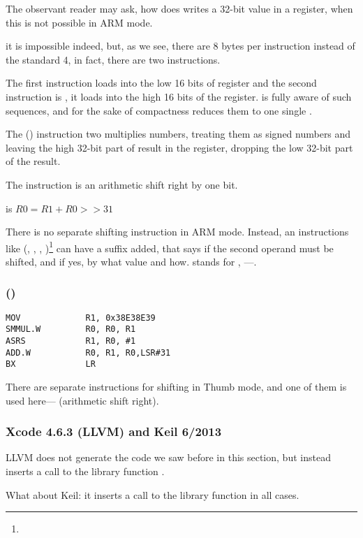 The observant reader may ask, how does \MOV writes a 32-bit value in a register, when this is not possible in ARM mode.

it is impossible indeed, but, as we see,
there are 8 bytes per instruction instead of the standard 4,
in fact, there are two instructions.

The first instruction loads  into the low 16 bits of register and the second instruction is
, it loads  into the high 16 bits of the register.
\IDA is fully aware of such sequences, and for the sake of compactness reduces them to one single .

The  () 
instruction two multiplies numbers, treating them as signed numbers
and leaving the high 32-bit part of result in the  register,
dropping the low 32-bit part of the result.

The instruction is an arithmetic shift right by one bit.

 is $R0=R1 + R0>>31$

\label{shifts_in_ARM_mode}

There is no separate shifting instruction in ARM mode.
Instead, an instructions like 
(\MOV, \ADD, \SUB, )\footnote{\DataProcessingInstructionsFootNote}
can have a suffix added, that says if the second operand must be shifted, and if yes, by what value and how.
 stands for , ---.

\subsubsection{\OptimizingXcodeIV (\ThumbTwoMode)}

\begin{lstlisting}
MOV             R1, 0x38E38E39
SMMUL.W         R0, R0, R1
ASRS            R1, R0, #1
ADD.W           R0, R1, R0,LSR#31
BX              LR
\end{lstlisting}


There are separate instructions for shifting in Thumb mode, 
and one of them is used here--- (arithmetic shift right).

\subsubsection{\NonOptimizing Xcode 4.6.3 (LLVM) and Keil 6/2013}

\NonOptimizing LLVM
does not generate the code we saw before in this section, but instead inserts a call to the library function 
.

What about Keil: it inserts a call to the library function  in all cases.
